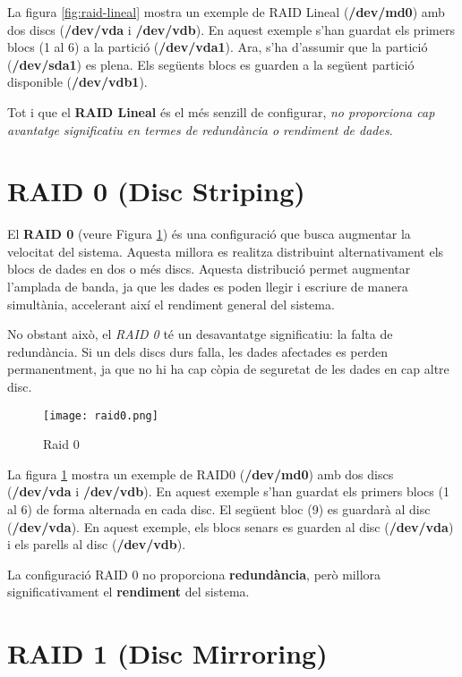 La figura \ref{fig:raid-lineal} mostra un exemple de RAID Lineal (\textbf{/dev/md0}) amb dos discs (\textbf{/dev/vda} i \textbf{/dev/vdb}). En aquest exemple s'han guardat els primers blocs (1 al 6) a la partició (\textbf{/dev/vda1}). Ara, s'ha d'assumir que la partició (\textbf{/dev/sda1}) es plena. Els següents blocs es guarden a la següent partició disponible (\textbf{/dev/vdb1}).

Tot i que el \textbf{RAID Lineal} és el més senzill de configurar, \textit{no proporciona cap avantatge significatiu en termes de redundància o rendiment de dades}.

\section{RAID 0 (Disc Striping)}\label{raid-0-disc-striping}

El \textbf{RAID 0} (veure Figura \ref{fig:raid0}) és una configuració que busca augmentar la velocitat del sistema. Aquesta millora es realitza distribuint alternativament els blocs de dades en dos o més discs. Aquesta distribució permet augmentar l'amplada de banda, ja que les dades es poden llegir i escriure de manera simultània, accelerant així el rendiment general del sistema.

No obstant això, el \emph{RAID 0} té un desavantatge significatiu: la falta de redundància. Si un dels discs durs falla, les dades afectades es perden permanentment, ja que no hi ha cap còpia de seguretat de les dades en cap altre disc.

\begin{figure}[!htb]
\centering
\texttt{[image: raid0.png]}
\caption{Raid 0}
\label{fig:raid0}
\end{figure}

La figura \ref{fig:raid0} mostra un exemple de RAID0 (\textbf{/dev/md0}) amb dos discs (\textbf{/dev/vda} i \textbf{/dev/vdb}). En aquest exemple s'han guardat els primers blocs (1 al 6) de forma alternada en cada disc. El següent bloc (9) es guardarà al disc (\textbf{/dev/vda}). En aquest exemple, els blocs senars es guarden al disc  (\textbf{/dev/vda}) i els parells al disc (\textbf{/dev/vdb}).

\begin{info}
La configuració RAID 0 no proporciona \textbf{redundància}, però millora significativament el \textbf{rendiment} del sistema.
\end{info}

\section{RAID 1 (Disc Mirroring)}\label{raid-1-disc-mirroring}

